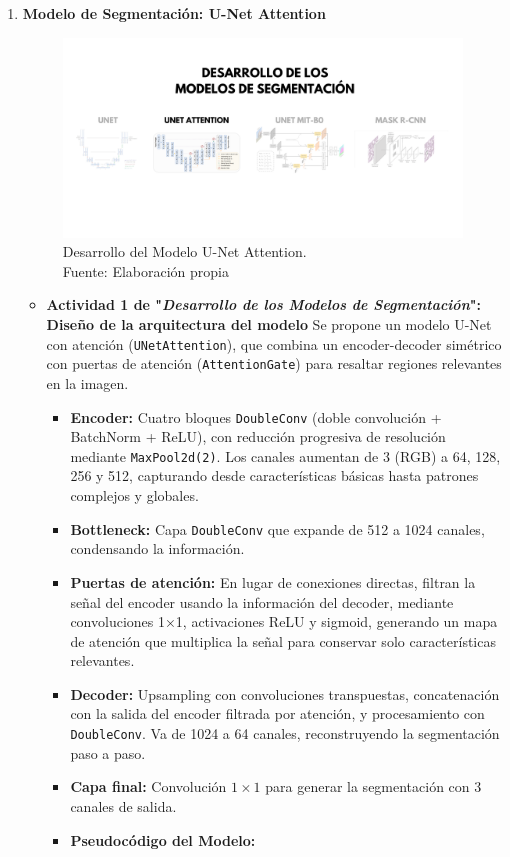 \begin{enumerate}
  \newpage
  \item \textbf{Modelo de Segmentación: U-Net Attention}
  \begin{figure}[H]
	\begin{center}
		\includegraphics[width=1\textwidth]{4/figures/desunetat.png}
		\caption[Desarrollo del Modelo U-Net Attention]{Desarrollo del Modelo U-Net Attention.\\
		Fuente: Elaboración propia}
		\label{4:figdesunetat}
	\end{center}
\end{figure}
  \begin{itemize}


  \item\textbf{Actividad 1 de "\textit{Desarrollo de los Modelos de Segmentación}": Diseño de la arquitectura del modelo}
Se propone un modelo U-Net con atención (\texttt{UNetAttention}), que combina un encoder-decoder simétrico con puertas de atención (\texttt{AttentionGate}) para resaltar regiones relevantes en la imagen.
\begin{itemize}
\item \textbf{Encoder:} Cuatro bloques \texttt{DoubleConv} (doble convolución + BatchNorm + ReLU), con reducción progresiva de resolución mediante \texttt{MaxPool2d(2)}. Los canales aumentan de 3 (RGB) a 64, 128, 256 y 512, capturando desde características básicas hasta patrones complejos y globales.
\item \textbf{Bottleneck:} Capa \texttt{DoubleConv} que expande de 512 a 1024 canales, condensando la información.
\item \textbf{Puertas de atención:} En lugar de conexiones directas, filtran la señal del encoder usando la información del decoder, mediante convoluciones 1×1, activaciones ReLU y sigmoid, generando un mapa de atención que multiplica la señal para conservar solo características relevantes.
\item \textbf{Decoder:} Upsampling con convoluciones transpuestas, concatenación con la salida del encoder filtrada por atención, y procesamiento con \texttt{DoubleConv}. Va de 1024 a 64 canales, reconstruyendo la segmentación paso a paso.
\item \textbf{Capa final:} Convolución $1\times1$ para generar la segmentación con 3 canales de salida.
\item \textbf{Pseudocódigo del Modelo:}




\end{itemize}
\end{itemize}
\end{enumerate}
